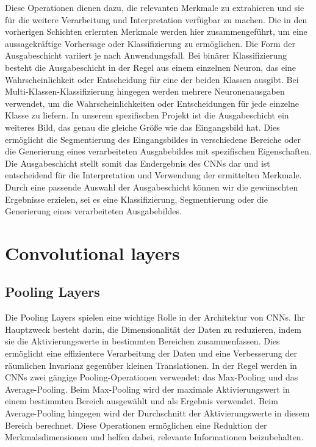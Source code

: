     Diese Operationen dienen dazu, die relevanten Merkmale zu extrahieren und sie für die weitere Verarbeitung und Interpretation verfügbar zu machen. Die in den vorherigen Schichten erlernten Merkmale werden hier zusammengeführt, um eine aussagekräftige Vorhersage oder Klassifizierung zu ermöglichen.
    Die Form der Ausgabeschicht variiert je nach Anwendungsfall. Bei binärer Klassifizierung besteht die Ausgabeschicht in der Regel aus einem einzelnen Neuron, das eine Wahrscheinlichkeit oder Entscheidung für eine der beiden Klassen ausgibt. 
    Bei Multi-Klassen-Klassifizierung hingegen werden mehrere Neuronenausgaben verwendet, um die Wahrscheinlichkeiten oder Entscheidungen für jede einzelne Klasse zu liefern.
    In unserem spezifischen Projekt ist die Ausgabeschicht ein weiteres Bild, das genau die gleiche Größe wie das Eingangsbild hat. 
    Dies ermöglicht die Segmentierung des Eingangsbildes in verschiedene Bereiche oder die Generierung eines verarbeiteten Ausgabebildes mit spezifischen Eigenschaften.
    Die Ausgabeschicht stellt somit das Endergebnis des CNNs dar und ist entscheidend für die Interpretation und Verwendung der ermittelten Merkmale. 
    Durch eine passende Auswahl der Ausgabeschicht können wir die gewünschten Ergebnisse erzielen, sei es eine Klassifizierung, Segmentierung oder die Generierung eines verarbeiteten Ausgabebildes.

\section{Convolutional layers}

\subsection{Pooling Layers}

    Die Pooling Layers spielen eine wichtige Rolle in der Architektur von \acfp{CNN}. 
    Ihr Hauptzweck besteht darin, die Dimensionalität der Daten zu reduzieren, indem sie die Aktivierungswerte in bestimmten Bereichen zusammenfassen. 
    Dies ermöglicht eine effizientere Verarbeitung der Daten und eine Verbesserung der räumlichen Invarianz gegenüber kleinen Translationen.
    In der Regel werden in CNNs zwei gängige Pooling-Operationen verwendet: das Max-Pooling und das Average-Pooling. 
    Beim Max-Pooling wird der maximale Aktivierungswert in einem bestimmten Bereich ausgewählt und als Ergebnis verwendet. 
    Beim Average-Pooling hingegen wird der Durchschnitt der Aktivierungswerte in diesem Bereich berechnet. 
    Diese Operationen ermöglichen eine Reduktion der Merkmalsdimensionen und helfen dabei, relevante Informationen beizubehalten.

